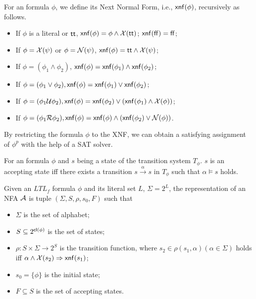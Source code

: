 \begin{definition}\label{def:xnf}
For an \ltlf formula $\phi$, we define its Next Normal Form, i.e., $\xnf(\phi)$, recursively as follows. 
\begin{itemize}
\item If $\phi$ is a literal or $\tt$, $\xnf(\phi) = \phi \wedge \X(\tt)$; $\xnf(\ff) = \ff$;
\item If $\phi = \X(\psi)$ or $\phi = \N(\psi)$, $\xnf(\phi) = \tt \wedge \X(\psi)$;
\item If $\phi = (\phi_1 \wedge \phi_2)$, $\xnf(\phi) = \xnf(\phi_1)\wedge\xnf(\phi_2)$;
\item If $\phi = (\phi_1 \vee \phi_2), \xnf(\phi) = \xnf(\phi_1)\vee \xnf(\phi_2)$; 
\item If $\phi = (\phi_1 \U \phi_2), \xnf(\phi) = \xnf(\phi_2) \vee (\xnf(\phi_1) \wedge \X(\phi))$; 
\item If $\phi = (\phi_1 \R \phi_2), \xnf(\phi) = \xnf(\phi)\wedge (\xnf(\phi_2) \vee \N(\phi))$.
\end{itemize}
\end{definition}

By restricting the \ltlf formula $\phi$ to the XNF, we can obtain a satisfying assignment of $\phi^{p}$ with the help of a SAT solver.

\begin{definition} 
For an \ltlf formula $\phi$ and $s$ being a state of the transition system $T_{\phi}$. $s$ is an accepting state iff there exists a transition $s \overset{\alpha}{\rightarrow}s$ in $T_{\phi}$ such that $\alpha \models s$ holds. 
\end{definition}
   
\begin{definition}\label{def:ltlf2nfa} 
Given an $LTL_f$ formula $\phi$ and its literal set $L$, $\Sigma = 2^{L}$, the representation of an NFA $\A$ is tuple $(\Sigma, S, \rho, s_0, F)$ such that
\begin{itemize}
	\item $\Sigma$ is the set of alphabet;
	\item $S\subseteq 2^{\cl(\phi)}$ is the set of states;
	\item $\rho:  S \times \Sigma \to 2^S$ is the transition function, where $s_2 \in \rho(s_1, \alpha) (\alpha \in \Sigma)$ holds iff $ \alpha \wedge \X(s_2) \Rightarrow \xnf(s_1)$;
	\item $s_0 = \{\phi \}$ is the initial state;
	\item $F\subseteq S$ is the set of accepting states. 
\end{itemize}
\end{definition}


